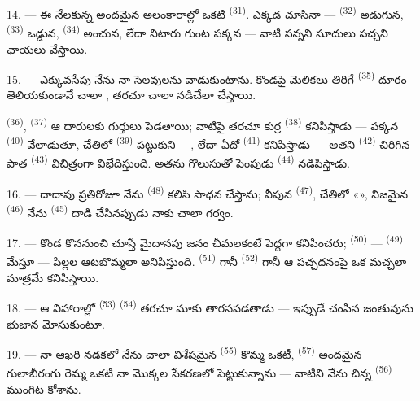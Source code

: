14. --- ఈ నేలకున్న అందమైన అలంకారాల్లో ఒకటి  \textsuperscript{(31)}.
ఎక్కడ చూసినా —  \textsuperscript{(32)} అడుగున, 
\textsuperscript{(33)} ఒడ్డున,  \textsuperscript{(34)} అంచున, లేదా నిటారు గుంట
పక్కన — వాటి సన్నని సూదులు పచ్చని ఛాయలు వేస్తాయి.

\VUsaut{5.0mm}
\VUsaut{3.4mm}

15. --- ఎక్కువసేపు  నేను నా సెలవులను వాడుకుంటాను. కొండపై మెలికలు తిరిగే
 \textsuperscript{(35)} దూరం తెలియకుండానే చాలా , తరచూ
చాలా  నడిచేలా చేస్తాయి.

 \textsuperscript{(36)}, 
\textsuperscript{(37)} ఆ దారులకు గుర్తులు పెడతాయి; వాటిపై తరచూ కుర్ర 
\textsuperscript{(38)} కనిపిస్తాడు — పక్కన  \textsuperscript{(40)} వేలాడుతూ,
చేతిలో  \textsuperscript{(39)} పట్టుకుని —, లేదా ఏదో
 \textsuperscript{(41)} కనిపిస్తాడు — అతని 
\textsuperscript{(42)} చిరిగిన పాత  \textsuperscript{(43)} విచిత్రంగా
విభేదిస్తుంది. అతను గొలుసుతో పెంపుడు  \textsuperscript{(44)}
నడిపిస్తాడు.

\VUsaut{3.4mm}

16. --- దాదాపు ప్రతిరోజూ నేను  \textsuperscript{(48)} కలిసి
 సాధన చేస్తాను; వీపున  \textsuperscript{(47)}, చేతిలో
«», నిజమైన  \textsuperscript{(46)} నేను
 \textsuperscript{(45)} దాడి చేసినప్పుడు నాకు చాలా గర్వం.

17. --- కొండ కొననుంచి చూస్తే మైదానపు జనం చీమలకంటే పెద్దగా కనిపించరు;
 \textsuperscript{(50)} —  \textsuperscript{(49)}
మేస్తూ — పిల్లల ఆటబొమ్మలా అనిపిస్తుంది.  \textsuperscript{(51)} గానీ
 \textsuperscript{(52)} గానీ ఆ పచ్చదనంపై ఒక మచ్చలా మాత్రమే కనిపిస్తాయి.

18. --- ఆ విహారాల్లో  \textsuperscript{(53)} 
\textsuperscript{(54)} తరచూ మాకు తారసపడతాడు — ఇప్పుడే చంపిన జంతువును భుజాన మోసుకుంటూ.

19. --- నా ఆఖరి నడకలో నేను చాలా విశేషమైన  \textsuperscript{(55)} కొమ్మ ఒకటీ,
 \textsuperscript{(57)} అందమైన గులాబీరంగు రెమ్మ ఒకటీ నా మొక్కల సేకరణలో
పెట్టుకున్నాను — వాటిని నేను చిన్న  \textsuperscript{(56)} ముంగిట కోశాను.

